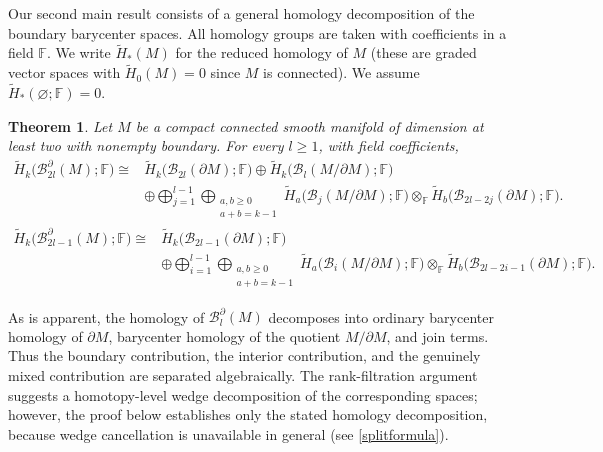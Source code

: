 \documentclass[11pt,a4paper]{article}
\numberwithin{equation}{section}
\newtheorem{thm}{Theorem}[section]
\theoremstyle{definition}
\theoremstyle{remark}
\newcommand{\F}{\mathbb{F}}
\newcommand{\pa}{\partial}
\newcommand{\wt}{\widetilde}
\newcommand{\BB}{\mathcal B}
\begin{document}
Our second main result consists of a general homology decomposition of the boundary barycenter spaces. 
All homology groups are taken with coefficients in a field \(\F\).  We write \(\wt H_*(M)\) for the reduced homology of $M$ (these are graded vector spaces with $\wt H_0(M)=0$ since $M$ is connected). We assume \(\wt H_*(\varnothing;\F)=0\).  

\begin{thm}\label{thm:intro-general-homology}
Let \(M\) be a compact connected smooth manifold of dimension at least two with nonempty boundary.  For every \(l\ge1\), with field coefficients,
\begin{equation}\label{eq:intro-general-even}
\begin{aligned}
\widetilde H_k\bigl(\BB_{2l}^{\partial}(M);\mathbb F\bigr)
\cong {}&
\widetilde H_k\bigl(\BB_{2l}(\partial M);\mathbb F\bigr)
\oplus
\widetilde H_k\bigl(\BB_l(M/\partial M);\mathbb F\bigr)
\\
&\oplus
\bigoplus_{j=1}^{l-1}
\bigoplus_{\substack{a,b\ge0\\a+b=k-1}}
\widetilde H_a\bigl(\BB_j(M/\partial M);\mathbb F\bigr)
\otimes_{\mathbb F}
\widetilde H_b\bigl(\BB_{2l-2j}(\partial M);\mathbb F\bigr).
\end{aligned}
\end{equation}
\begin{equation}\label{eq:intro-general-odd}
\begin{aligned}
\widetilde H_k\bigl(\BB_{2l-1}^{\partial}(M);\mathbb F\bigr)
\cong {}&
\widetilde H_k\bigl(\BB_{2l-1}(\partial M);\mathbb F\bigr)
\\
&\oplus
\bigoplus_{i=1}^{l-1}
\bigoplus_{\substack{a,b\ge0\\a+b=k-1}}
\widetilde H_a\bigl(\BB_i(M/\partial M);\mathbb F\bigr)
\otimes_{\mathbb F}
\widetilde H_b\bigl(\BB_{2l-2i-1}(\partial M);\mathbb F\bigr).
\end{aligned}
\end{equation}
\end{thm}

As is apparent, the homology of \(\BB_l^{\pa}(M)\) decomposes into ordinary barycenter homology of \(\pa M\), barycenter homology of the quotient \(M/\pa M\), and join terms.  Thus the boundary contribution, the interior contribution, and the genuinely mixed contribution are separated algebraically.  
The rank-filtration argument suggests a homotopy-level wedge decomposition of the corresponding spaces; however, the proof below establishes only the stated homology decomposition, because wedge cancellation is unavailable in general (see \eqref{splitformula}).
\end{document}
